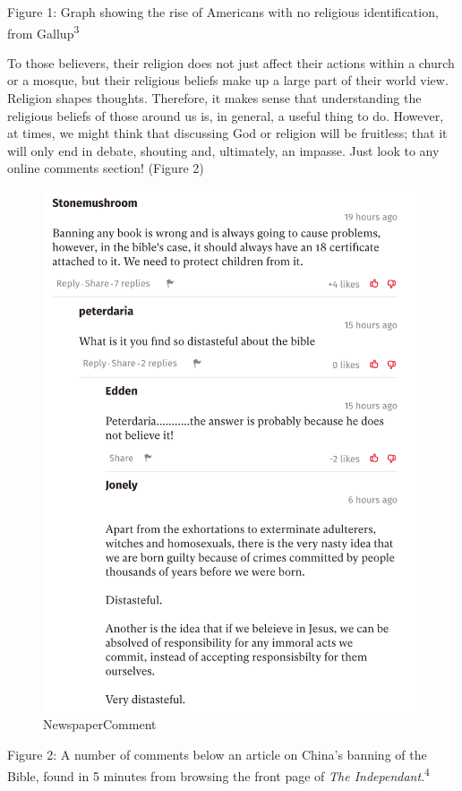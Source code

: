 \documentclass[]{article}
\begin{document}
Figure 1: Graph showing the rise of Americans with no religious
identification, from Gallup\textsuperscript{3}

To those believers, their religion does not just affect their actions
within a church or a mosque, but their religious beliefs make up a large
part of their world view. Religion shapes thoughts. Therefore, it makes
sense that understanding the religious beliefs of those around us is, in
general, a useful thing to do. However, at times, we might think that
discussing God or religion will be fruitless; that it will only end in
debate, shouting and, ultimately, an impasse. Just look to any online
comments section! (Figure 2)

\begin{figure}
\centering
\includegraphics{./NewspaperComments.png}
\caption{NewspaperComment}
\end{figure}

Figure 2: A number of comments below an article on China's banning of
the Bible, found in 5 minutes from browsing the front page of \emph{The
Independant}.\textsuperscript{4}
\end{document}
